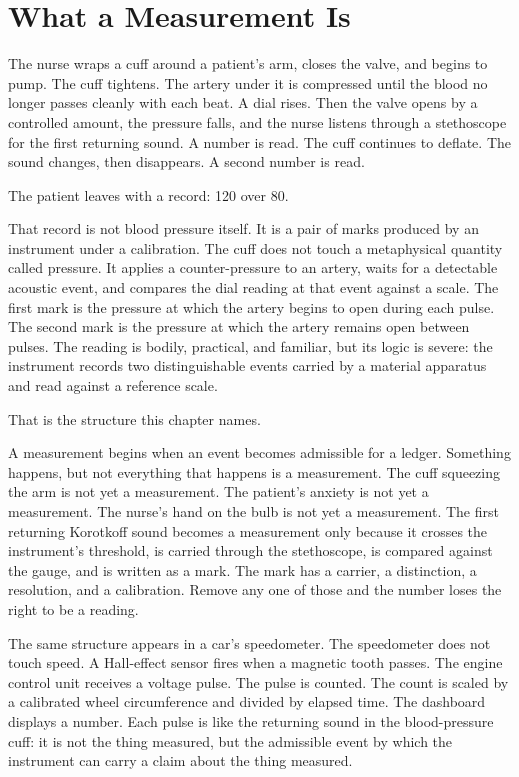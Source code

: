\chapter{What a Measurement Is}
\label{chap:what-a-measurement-is}


\begin{chapteressay}

The nurse wraps a cuff around a patient's arm, closes the valve, and begins to
pump. The cuff tightens. The artery under it is compressed until the blood no
longer passes cleanly with each beat. A dial rises. Then the valve opens by a
controlled amount, the pressure falls, and the nurse listens through a
stethoscope for the first returning sound. A number is read. The cuff continues
to deflate. The sound changes, then disappears. A second number is read.

The patient leaves with a record: 120 over 80.

That record is not blood pressure itself. It is a pair of marks produced by an
instrument under a calibration. The cuff does not touch a metaphysical quantity
called pressure. It applies a counter-pressure to an artery, waits for a
detectable acoustic event, and compares the dial reading at that event against a
scale. The first mark is the pressure at which the artery begins to open during
each pulse. The second mark is the pressure at which the artery remains open
between pulses. The reading is bodily, practical, and familiar, but its logic is
severe: the instrument records two distinguishable events carried by a material
apparatus and read against a reference scale.

That is the structure this chapter names.

A measurement begins when an event becomes admissible for a ledger. Something
happens, but not everything that happens is a measurement. The cuff squeezing
the arm is not yet a measurement. The patient's anxiety is not yet a
measurement. The nurse's hand on the bulb is not yet a measurement. The first
returning Korotkoff sound becomes a measurement only because it crosses the
instrument's threshold, is carried through the stethoscope, is compared against
the gauge, and is written as a mark. The mark has a carrier, a distinction, a
resolution, and a calibration. Remove any one of those and the number loses the
right to be a reading.

The same structure appears in a car's speedometer. The speedometer does not
touch speed. A Hall-effect sensor fires when a magnetic tooth passes. The engine
control unit receives a voltage pulse. The pulse is counted. The count is
scaled by a calibrated wheel circumference and divided by elapsed time. The
dashboard displays a number. Each pulse is like the returning sound in the
blood-pressure cuff: it is not the thing measured, but the admissible event by
which the instrument can carry a claim about the thing measured.


\end{chapteressay}
